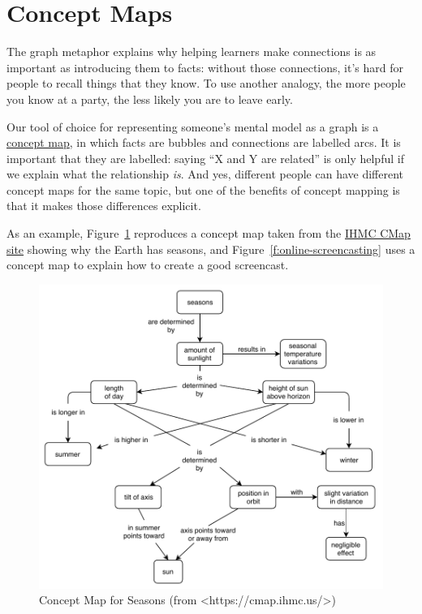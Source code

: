 \section{Concept Maps}\label{s:memory-concept-maps}

The graph metaphor explains why helping learners make connections is as
important as introducing them to facts: without those connections, it's
hard for people to recall things that they know. To use another analogy,
the more people you know at a party, the less likely you are to leave
early.

Our tool of choice for representing someone's mental model as a graph is
a \protect\hyperlink{g:concept-map}{concept map}, in which facts are bubbles
and connections are labelled arcs. It is important that they are
labelled: saying ``X and Y are related'' is only helpful if we explain
what the relationship \emph{is}. And yes, different people can have different
concept maps for the same topic, but one of the benefits of concept
mapping is that it makes those differences explicit.

As an example, Figure~\ref{f:memory-seasons} reproduces a concept map
taken from the \href{https://cmap.ihmc.us/}{IHMC CMap site} showing why the
Earth has seasons, and Figure~\ref{f:online-screencasting} uses a concept
map to explain how to create a good screencast.

\begin{figure}
\centering
\includegraphics{../../figures/seasons.pdf}
\caption{Concept Map for Seasons (from \textless{}https://cmap.ihmc.us/\textgreater{})}
\label{f:memory-seasons}
\end{figure}

